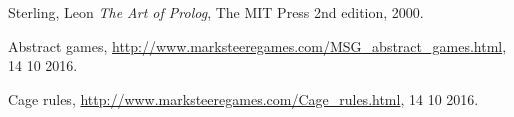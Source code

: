 \documentclass[a4paper,11pt]{article}
\begin{document}
\begin{thebibliography}{9}
  Sterling, Leon
  \emph{The Art of Prolog},
  The MIT Press
  2nd edition,
  2000.
  
  Abstract games,
  \url{http://www.marksteeregames.com/MSG_abstract_games.html}, 14 10 2016.
  
  Cage rules,
  \url{http://www.marksteeregames.com/Cage_rules.html}, 14 10 2016.
\end{thebibliography}
\end{document}
